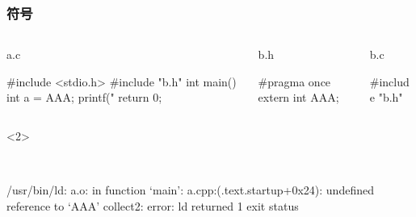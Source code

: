 \documentclass[UTF8,lualatex]{ctexbeamer}
\begin{document}
\begin{frame}[fragile,t]
    \frametitle{符号}
    \scriptsize
    \begin{columns}[t]
        \begin{column}{.3\textwidth}
            \begin{exampleblock}{a.c}
                \begin{cppcode}
                    #include <stdio.h>
                    #include "b.h"
                    int main() {
                        int a = AAA;
                        printf("%
                        return 0;
                    }
                \end{cppcode}
            \end{exampleblock}
        \end{column}
        \begin{column}{.33\textwidth}
            \begin{exampleblock}{b.h}
                \begin{cppcode}
                    #pragma once
                    extern int AAA;
                \end{cppcode}
            \end{exampleblock}
        \end{column}
        \begin{column}{.33\textwidth}
            \begin{exampleblock}{b.c}
                \begin{cppcode}
                    #include "b.h"
                \end{cppcode}
            \end{exampleblock}
        \end{column}
    \end{columns}
    \begin{onlyenv}<2>
        \begin{block}{~}
            \begin{consolecode}
                /usr/bin/ld: a.o: in function `main':
                a.cpp:(.text.startup+0x24): undefined reference to `AAA'
                collect2: error: ld returned 1 exit status
            \end{consolecode}
        \end{block}
    \end{onlyenv}
\end{frame}
\end{document}
